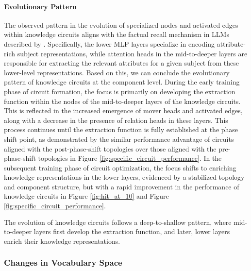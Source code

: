 \paragraph{Evolutionary Pattern}
The observed pattern in the evolution of specialized nodes and activated edges within knowledge circuits aligns with the factual recall mechanism in LLMs described by \citet{llm_factual_recall}.
Specifically, the lower MLP layers specialize in encoding attribute-rich subject representations, while attention heads in the mid-to-deeper layers are responsible for extracting the relevant attributes for a given subject from these lower-level representations.
Based on this, we can conclude the evolutionary pattern of knowledge circuits at the component level.
During the early training phase of circuit formation, the focus is primarily on developing the extraction function within the nodes of the mid-to-deeper layers of the knowledge circuits.
This is reflected in the increased emergence of mover heads and activated edges, along with a decrease in the presence of relation heads in these layers.
This process continues until the extraction function is fully established at the phase shift point, as demonstrated by the similar performance advantage of circuits aligned with the post-phase-shift topologies over those aligned with the pre-phase-shift topologies in Figure \ref{fig:specific_circuit_performance}.
In the subsequent training phase of circuit optimization, the focus shifts to enriching knowledge representations in the lower layers, evidenced by a stabilized topology and component structure, but with a rapid improvement in the performance of knowledge circuits in Figure \ref{fig:hit_at_10} and Figure \ref{fig:specific_circuit_performance}.

\begin{tcolorbox}[mybox, title={Takeaway: Deep-to-Shallow Pattern}]
The evolution of knowledge circuits follows a deep-to-shallow pattern, where mid-to-deeper layers first develop the extraction function, and later, lower layers enrich their knowledge representations.
\end{tcolorbox}

\subsubsection{Changes in Vocabulary Space}
\label{sec:rank_prob}


